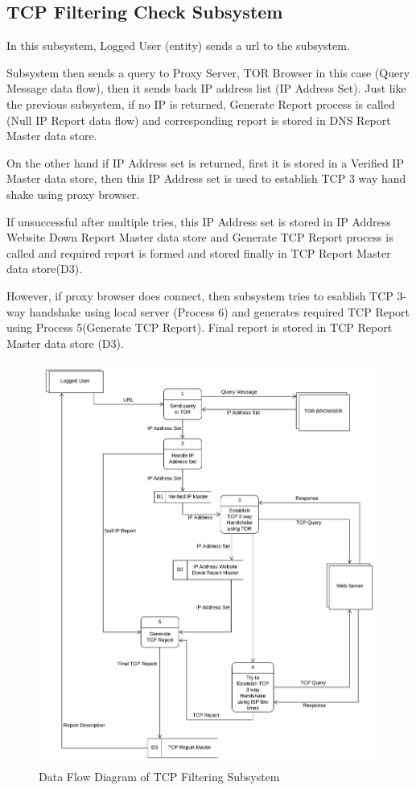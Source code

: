 \documentclass[12pt]{article}
\begin{document}
\newpage
\subsection{TCP Filtering Check Subsystem}
In this subsystem, Logged User (entity) sends a url to the subsystem.

Subsystem then sends a  query to Proxy Server, TOR Browser in this case (Query Message data flow), then it sends back IP address list (IP Address Set). Just like the previous subsystem, if no IP is returned, Generate Report process is called (Null IP Report data flow) and corresponding report is stored in DNS Report Master data store. 

On the other hand if IP Address set is returned, first it is stored in a Verified IP Master data store, then this IP Address set is used to establish TCP 3 way hand shake using proxy browser. 

If unsuccessful after multiple tries, this IP Address set is stored in IP Address Website Down Report Master data store and Generate TCP Report process is called and required report is formed and stored finally in TCP Report Master data store(D3). 

However, if proxy browser does connect, then subsystem tries to esablish TCP 3-way handshake using local server (Process 6) and generates required TCP Report using Process 5(Generate TCP Report). Final report is stored in TCP Report Master data store (D3).
\begin{figure}[H]
    \centering
    \includegraphics[width=\textwidth]{dfdtcp.png}
    \caption{Data Flow Diagram of TCP Filtering Subsystem}
    \label{fig:dfdtcp}
\end{figure}
\end{document}
